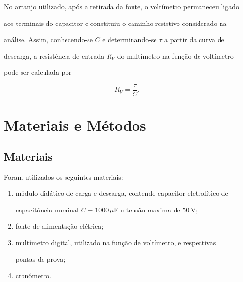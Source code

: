\documentclass[a4paper,12pt]{article}
\begin{document}
No arranjo utilizado, após a retirada da fonte, o voltímetro permaneceu ligado

aos terminais do capacitor e constituiu o caminho resistivo considerado na

análise. Assim, conhecendo-se $C$ e determinando-se $\tau$ a partir da curva de

descarga, a resistência de entrada $R_V$ do multímetro na função de voltímetro

pode ser calculada por

\begin{equation}

  R_V=\frac{\tau}{C}.

  \label{eq:resistencia}

\end{equation}




\section{Materiais e Métodos}

\subsection{Materiais}

Foram utilizados os seguintes materiais:

\begin{enumerate}[label=\alph*.]

  \item módulo didático de carga e descarga, contendo capacitor eletrolítico de

  capacitância nominal $C=1000\,\mu\mathrm{F}$ e tensão máxima de $50\,\mathrm{V}$;

  \item fonte de alimentação elétrica;

  \item multímetro digital, utilizado na função de voltímetro, e respectivas

  pontas de prova;

  \item cronômetro.

\end{enumerate}
\end{document}
